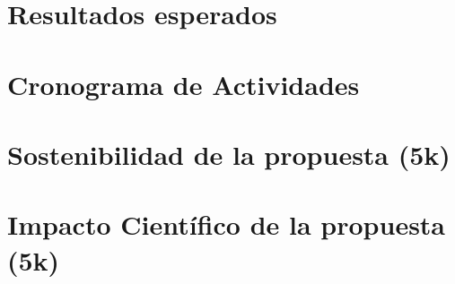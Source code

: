 \documentclass[a4paper,11pt]{article}
\begin{document}
\section{Resultados esperados}

\section{Cronograma de Actividades}

\section{Sostenibilidad de la propuesta (5k)}

\section{Impacto Científico de la propuesta (5k)}






%



	
\end{document}
